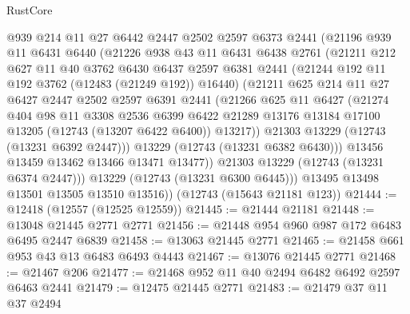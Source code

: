 \begin{lexlean}{RustCore}
\begin{coremodule}
            @939
            @214
            @11
            @27
            @6442
            @2447
            @2502
            @2597
            @6373
            @2441
            (@21196
              @939
              @11
              @6431
              @6440
              (@21226
                @938
                @43
                @11
                @6431
                @6438
                @2761
                (@21211
                  @212
                  @627
                  @11
                  @40
                  @3762
                  @6430
                  @6437
                  @2597
                  @6381
                  @2441
                  (@21244 @192 @11 @192 @3762 (@12483 (@21249 @192)) @16440)
                  (@21211
                    @625
                    @214
                    @11
                    @27
                    @6427
                    @2447
                    @2502
                    @2597
                    @6391
                    @2441
                    (@21266
                      @625
                      @11
                      @6427
                      (@21274
                        @404
                        @98
                        @11
                        @3308
                        @2536
                        @6399
                        @6422
                        @21289
                        @13176
                        @13184
                        @17100
                        @13205
                        (@12743 (@13207 @6422 @6400))
                        @13217))
                    @21303
                    @13229
                    (@12743 (@13231 @6392 @2447)))
                  @13229
                  (@12743 (@13231 @6382 @6430)))
                @13456
                @13459
                @13462
                @13466
                @13471
                @13477))
            @21303
            @13229
            (@12743 (@13231 @6374 @2447)))
          @13229
          (@12743 (@13231 @6300 @6445)))
        @13495
        @13498
        @13501
        @13505
        @13510
        @13516))
    (@12743 (@15643 @21181 @123))
@21444 := @12418 (@12557 (@12525 @12559))
@21445 := @21444 @21181
@21448 := @13048 @21445 @2771 @2771
@21456 := @21448 @954 @960 @987 @172 @6483 @6495 @2447 @6839
@21458 := @13063 @21445 @2771
@21465 := @21458 @661 @953 @43 @13 @6483 @6493 @4443
@21467 := @13076 @21445 @2771
@21468 := @21467 @206
@21477 := @21468 @952 @11 @40 @2494 @6482 @6492 @2597 @6463 @2441
@21479 := @12475 @21445 @2771
@21483 := @21479 @37 @11 @37 @2494

\end{coremodule}
\end{lexlean}
